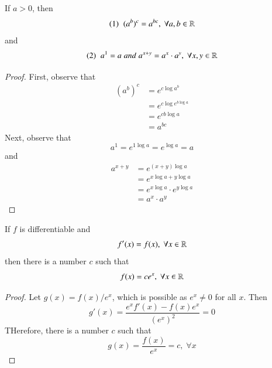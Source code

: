 \documentclass[12pt, a4paper, oneside, openright, titlepage]{book}
\begin{document}
\begin{subappendices}
    \begin{thm}
        If $a > 0$, then \begin{equation*}
            (1)\;\;(a^b)^c = a^{bc},\;\forall a,b\in\mathbb R
        \end{equation*}
        and \begin{equation*}
            (2)\;\;a^1=a\;and\;a^{x+y}=a^x\cdot a^y,\;\forall x,y\in\mathbb R
        \end{equation*}
    \end{thm}
    \begin{proof}
        First, observe that \begin{align*}
            (a^b)^c &= e^{c\log a^b} \\
            &= e^{c\log e^{b\log a}} \\
            &= e^{cb\log a} \\
            &= a^{bc}
        \end{align*}
        Next, observe that \begin{equation*}
            a^1 = e^{1\log a} = e^{\log a} = a
        \end{equation*}
        and \begin{align*}
            a^{x+y} &= e^{(x+y)\log a} \\
            &= e^{x\log a + y\log a} \\
            &= e^{x\log a} \cdot e^{y\log a} \\
            &= a^x \cdot a^y
        \end{align*}
    \end{proof}

    \begin{thm}
        If $f$ is differentiable and \begin{equation*}
            f'(x) = f(x),\;\forall x\in\mathbb R
        \end{equation*}
        then there is a number $c$ such that \begin{equation*}
            f(x) = ce^x,\;\forall x\in\mathbb R
        \end{equation*}
    \end{thm}
    \begin{proof}
        Let $g(x) = f(x)/e^x$, which is possible as $e^x \neq 0$ for all $x$. Then \begin{equation*}
            g'(x) = \frac{e^xf'(x) - f(x)e^x}{(e^x)^2} = 0
        \end{equation*}
        THerefore, there is a number $c$ such that \begin{equation*}
            g(x) = \frac{f(x)}{e^x} = c,\;\forall x
        \end{equation*}
    \end{proof}
    


\end{subappendices}
\end{document}
